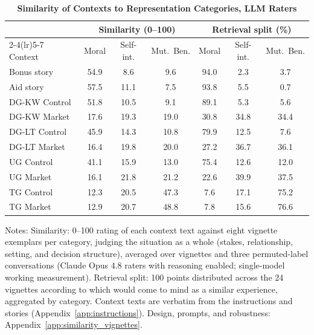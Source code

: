 \begin{table}[!htbp]
\centering
\footnotesize
\renewcommand{\arraystretch}{1.15}
\caption{\textbf{Similarity of Contexts to Representation Categories, LLM Raters}}
\label{tab:similarity_categories}
\begin{tabular}{l ccc ccc}
\toprule
& \multicolumn{3}{c}{Similarity (0--100)} & \multicolumn{3}{c}{Retrieval split (\%)} \\
\cmidrule(lr){2-4}\cmidrule(lr){5-7}
Context & Moral & Self-int. & Mut.\ Ben. & Moral & Self-int. & Mut.\ Ben. \\
\midrule
Bonus story & 54.9 & 8.6 & 9.6 & 94.0 & 2.3 & 3.7 \\
Aid story & 57.5 & 11.1 & 7.5 & 93.8 & 5.5 & 0.7 \\
\midrule
DG-KW Control & 51.8 & 10.5 & 9.1 & 89.1 & 5.3 & 5.6 \\
DG-KW Market & 17.6 & 19.3 & 19.0 & 30.8 & 34.8 & 34.4 \\
DG-LT Control & 45.9 & 14.3 & 10.8 & 79.9 & 12.5 & 7.6 \\
DG-LT Market & 16.4 & 19.8 & 20.0 & 27.2 & 36.7 & 36.1 \\
UG Control & 41.1 & 15.9 & 13.0 & 75.4 & 12.6 & 12.0 \\
UG Market & 16.1 & 21.8 & 21.2 & 22.6 & 39.9 & 37.5 \\
TG Control & 12.3 & 20.5 & 47.3 & 7.6 & 17.1 & 75.2 \\
TG Market & 12.9 & 20.7 & 48.8 & 7.8 & 15.6 & 76.6 \\
\bottomrule
\end{tabular}
\begin{flushleft}
\footnotesize Notes: Similarity: 0--100 rating of each context text against eight vignette exemplars per category, judging the situation as a whole (stakes, relationship, setting, and decision structure), averaged over vignettes and three permuted-label conversations (Claude Opus 4.8 raters with reasoning enabled; single-model working measurement). Retrieval split: 100 points distributed across the 24 vignettes according to which would come to mind as a similar experience, aggregated by category. Context texts are verbatim from the instructions and stories (Appendix~\ref{app:instructions}). Design, prompts, and robustness: Appendix~\ref{app:similarity_vignettes}.
\end{flushleft}
\end{table}
